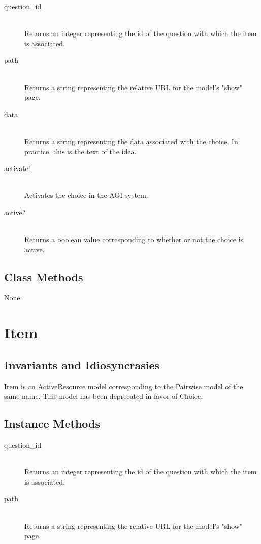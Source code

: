 \documentclass[11pt]{book}
\begin{document}
\begin{description}
  
  \item[question\_id]  \hfill \\
  \emph{} Returns an integer representing the id of the question with which the item is associated.
  
  \item[path]  \hfill \\
  \emph{} Returns a string representing the relative URL for the model's "show" page.
  
  \item[data]  \hfill \\
  \emph{} Returns a string representing the data associated with the choice.  In practice, this is the text of the idea.
  
  \item[activate!]  \hfill \\
  \emph{} Activates the choice in the AOI system.
  
  \item[active?]  \hfill \\
  \emph{} Returns a boolean value corresponding to whether or not the choice is active.

\end{description}


\subsection{Class Methods}

None.


\section{Item}

\subsection{Invariants and Idiosyncrasies}

Item is an ActiveResource model corresponding to the Pairwise model of the same name.  This model has been deprecated in favor of Choice.

\subsection{Instance Methods}

\begin{description}
  
  \item[question\_id]  \hfill \\
  \emph{} Returns an integer representing the id of the question with which the item is associated.
  
  \item[path]  \hfill \\
  \emph{} Returns a string representing the relative URL for the model's "show" page.

\end{description}
\end{document}

